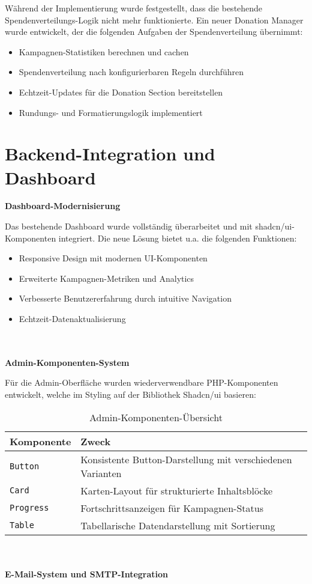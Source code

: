 Während der Implementierung wurde festgestellt, dass die bestehende Spendenverteilungs-Logik nicht mehr funktionierte.
Ein neuer Donation Manager wurde entwickelt, der die folgenden Aufgaben der Spendenverteilung übernimmt:

\begin{itemize}
    \item Kampagnen-Statistiken berechnen und cachen
    \item Spendenverteilung nach konfigurierbaren Regeln durchführen
    \item Echtzeit-Updates für die Donation Section bereitstellen
    \item Rundungs- und Formatierungslogik implementiert
\end{itemize}

\section{Backend-Integration und Dashboard}
\textbf{Dashboard-Modernisierung}

Das bestehende Dashboard wurde vollständig überarbeitet und mit shadcn/ui-Komponenten integriert.
Die neue Lösung bietet u.a. die folgenden Funktionen:

\begin{itemize}
    \item Responsive Design mit modernen UI-Komponenten
    \item Erweiterte Kampagnen-Metriken und Analytics
    \item Verbesserte Benutzererfahrung durch intuitive Navigation
    \item Echtzeit-Datenaktualisierung
\end{itemize}
\\\\
\textbf{Admin-Komponenten-System}

Für die Admin-Oberfläche wurden wiederverwendbare PHP-Komponenten entwickelt, welche im Styling auf der Bibliothek Shadcn/ui basieren:

\begin{table}[H]
    \centering
    \begin{tabular}{|l|p{8cm}|}
        \hline
        \textbf{Komponente} & \textbf{Zweck} \\
        \hline
        \texttt{Button} & Konsistente Button-Darstellung mit verschiedenen Varianten \\
        \texttt{Card} & Karten-Layout für strukturierte Inhaltsblöcke \\
        \texttt{Progress} & Fortschrittsanzeigen für Kampagnen-Status \\
        \texttt{Table} & Tabellarische Datendarstellung mit Sortierung \\
        \hline
    \end{tabular}
    \caption{Admin-Komponenten-Übersicht}
    \label{tab:admin-components}
\end{table}
\\\\
\textbf{E-Mail-System und SMTP-Integration}

